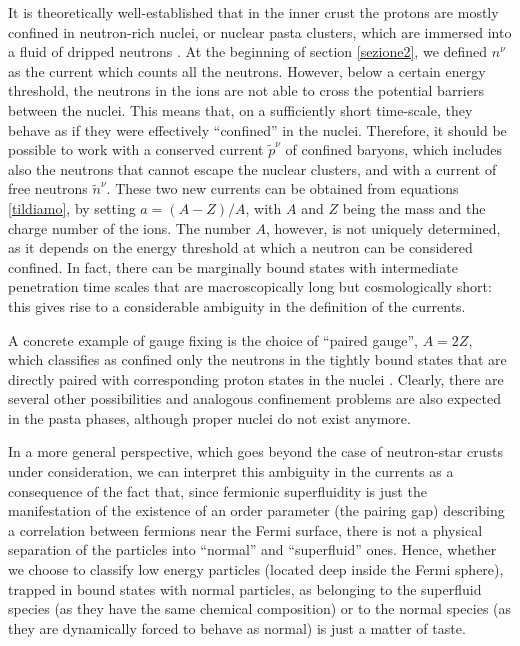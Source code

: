 \documentclass[preprints,article,accept,moreauthors,pdftex]{mdpi}
\begin{document}
It is theoretically well-established that in the inner crust the protons are mostly confined in neutron-rich nuclei, or  nuclear pasta clusters, which are immersed into a fluid of dripped neutrons \cite{chamel_review_crust}. 
At the beginning of section \ref{sezione2}, we defined $n^\nu$ as the current which counts all the neutrons. However, below a certain energy threshold, the neutrons in the ions are not able to cross the potential barriers between the nuclei. This means that, on a sufficiently short time-scale, they behave as if they were effectively ``confined'' in the nuclei. 
Therefore, it should be possible to work with a conserved current $\tilde{p}^\nu$ of confined baryons, which includes also the neutrons that cannot escape the nuclear clusters, and with a current of free neutrons $\tilde{n}^\nu$. These two new currents can be obtained from equations \eqref{tildiamo}, by setting $a=(A-Z)/A$, with $A$ and $Z$ being the mass and the charge number of the ions. 
The number $A$, however, is not uniquely determined, as it depends on the energy threshold at which a neutron can be considered confined. 
In fact, there can be marginally bound states with intermediate penetration time scales that are macroscopically long but cosmologically short: this gives rise to a considerable ambiguity in the definition of the currents. 

A concrete example of gauge fixing is the choice of ``paired gauge'', $A=2Z$, which classifies as confined only the neutrons in the tightly bound states that are directly paired with corresponding proton states in the nuclei \cite{carter_macro_2006}. 
Clearly, there are several other possibilities and  analogous confinement problems are also expected in the pasta phases, although proper nuclei do not exist anymore.

In a more general perspective, which goes beyond the case of neutron-star crusts under consideration, we can interpret this ambiguity in the currents as a consequence of the fact that, since fermionic superfluidity is just the manifestation of the existence of an order parameter (the pairing gap) describing a correlation between fermions near the Fermi surface, there is not a physical separation of the particles into ``normal'' and ``superfluid'' ones. 
Hence, whether we choose to classify low energy particles (located deep inside the Fermi sphere), trapped in bound states with normal particles, as belonging to the superfluid species (as they have the same chemical composition) or to the normal species (as they are dynamically forced to behave as normal) is just a matter of taste. 
\end{document}
